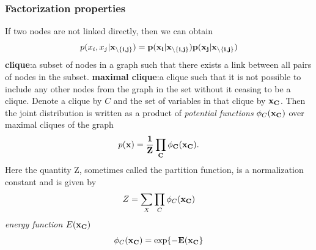 \documentclass[a4paper]{book}
\begin{document}
\subsubsection{Factorization properties}
If two nodes are not linked directly, then we can obtain
\begin{equation}\label{eq8.10}
  p(x_i,x_j|\bf{x}_{\backslash\{i,j\}}) = p(x_i|\bf x_{\backslash\{i,j\}})p(x_j|\bf x_{\backslash\{i,j\}})
\end{equation}
\textbf{clique}:a subset of nodes in a graph such that there exists a link between all pairs of nodes in the subset. \newline
\textbf{maximal clique}:a clique such that it is not possible to include any
other nodes from the graph in the set without it ceasing to be a clique.\newline
Denote a clique by $C$ and the set of variables in that clique by $\bf x_C$. Then the joint distribution is written as a product of \textit{potential functions}
$\phi_C(\bf x_C)$ over maximal cliques of the graph
\begin{equation}\label{eq8.11}
  p(\bf x) = \frac{1}{Z}\prod_{C}\phi_C(\bf x_C).
\end{equation}
Here the quantity Z, sometimes called the partition function, is a normalization constant
and is given by
\begin{equation}\label{eq8.12}
  Z=\sum_{X}\prod_{C}\phi_C(\bf x_C)
\end{equation}
\textit{energy function} $E(\bf x_C)$
\begin{equation}\label{eq8.13}
  \phi_C(\bf x_C) = \exp\{-E(\bf x_C\}
\end{equation}
\end{document}
